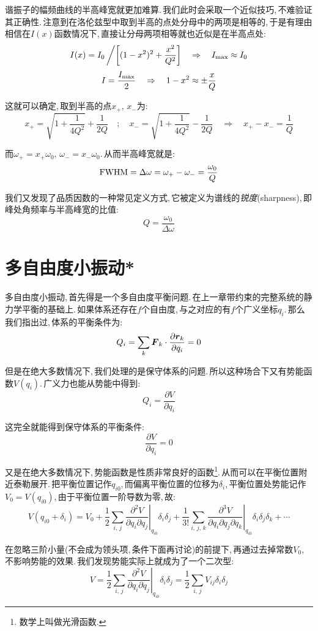 谐振子的幅频曲线的半高峰宽就更加难算.\,我们此时会采取一个近似技巧,\,不难验证其正确性.\,注意到在洛伦兹型中取到半高的点处分母中的两项是相等的,\,于是有理由相信在$I(x)$函数情况下,\,直接让分母两项相等就也近似是在半高点处:
\[I(x)=I_0\left/\middle[(1-x^2)^2+\frac{x^2}{Q^2}\right]\quad\Rightarrow\quad I_{\rm max}\approx I_0\]
\[I=\frac{I_{\rm max}}{2}\quad\Rightarrow\quad 1-x^2\approx \pm\frac{x}{Q}\]

这就可以确定,\,取到半高的点$x_+,\,x_-$为:
\[x_+=\sqrt{1+\frac{1}{4Q^2}}+\frac{1}{2Q}\quad;\quad x_-=\sqrt{1+\frac{1}{4Q^2}}-\frac{1}{2Q}\quad\Rightarrow \quad x_+-x_-=\frac{1}{Q}\]



而$\omega_+=x_+\omega_0,\,\omega_-=x_-\omega_0$.\,从而半高峰宽就是:
\[{\rm FWHM}=\Delta\omega=\omega_+-\omega_-=\frac{\omega_0}{Q}\]

我们又发现了品质因数的一种常见定义方式,\,它被定义为谱线的\emph{锐度}(sharpness),\,即峰处角频率与半高峰宽的比值:
\[Q=\frac{\omega_0}{\Delta \omega}\]





\section{多自由度小振动*}

多自由度小振动,\,首先得是一个多自由度平衡问题.\,在上一章带约束的完整系统的静力学平衡的基础上.\,如果体系还存在$f$个自由度,\,与之对应的有$f$个广义坐标$q_i$.\,那么我们指出过,\,体系的平衡条件为:
\[Q_i=\sum_k \boldsymbol{F}_k\cdot \frac{\partial \boldsymbol{r}_k}{\partial q_i}=0\]

但是在绝大多数情况下,\,我们处理的是保守体系的问题.\,所以这种场合下又有势能函数$V(q_i)$.\,广义力也能从势能中得到:
\[Q_i=\frac{\partial V}{\partial q_i}\]

这完全就能得到保守体系的平衡条件:
\[\frac{\partial V}{\partial q_i}=0\]

又是在绝大多数情况下,\,势能函数是性质非常良好的函数\footnote{数学上叫做光滑函数.}.\,从而可以在平衡位置附近泰勒展开.\,把平衡位置记作$q_{i0}$,\,而偏离平衡位置的位移为$\delta_i$,\,平衡位置处势能记作$V_0=V(q_{i0})$,\,由于平衡位置一阶导数为零,\,故:
\[V(q_{i0}+\delta_i)=V_0+\frac{1}{2}\sum_{i,\,j}\left.\frac{\partial^2 V}{\partial q_i\partial q_j}\right|_{q_{i0}}\delta_i\delta_j+\frac{1}{3!}\sum_{i,\,j,\,k}\left.\frac{\partial^3 V}{\partial q_i\partial q_j\partial q_k}\right|_{q_{i0}}\delta_i\delta_j\delta_k+\cdots\]

在忽略三阶小量(不会成为领头项,\,条件下面再讨论)的前提下,\,再通过去掉常数$V_0$,\,不影响势能的效果.\,我们发现势能实际上就成为了一个二次型:
\[V=\frac{1}{2}\sum_{i,\,j}\left.\frac{\partial^2 V}{\partial q_i\partial q_j}\right|_{q_{i0}}\delta_i\delta_j=\frac{1}{2}\sum_{i,\,j} V_{ij}\delta_i\delta_j\]

